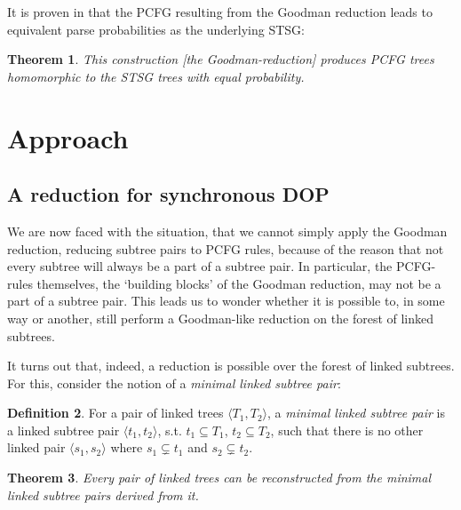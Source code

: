 \documentclass[a4paper]{article}
\newtheorem{theorem}{Theorem}[section]
\theoremstyle{definition}
\newtheorem{definition}[theorem]{Definition}
\begin{document}
It is proven in \cite{Go} that the PCFG resulting from the Goodman reduction leads to equivalent parse probabilities as the underlying STSG:

\begin{theorem}
This construction [the Goodman-reduction] produces PCFG trees homomorphic to the STSG trees with equal probability.
\end{theorem}

\section{Approach}

\subsection{A reduction for synchronous DOP}

We are now faced with the situation, that we cannot simply apply the Goodman reduction, reducing subtree pairs to PCFG rules, because of the reason that not every subtree will always be a part of a subtree pair. In particular, the PCFG-rules themselves, the `building blocks' of the Goodman reduction, may not be a part of a subtree pair. This leads us to wonder whether it is possible to, in some way or another, still perform a Goodman-like reduction on the forest of linked subtrees.

It turns out that, indeed, a reduction is possible over the forest of linked subtrees. For this, consider the notion of a \emph{minimal linked subtree pair}:

\begin{definition}
For a pair of linked trees $\langle T_1, T_2 \rangle$, a \emph{minimal linked subtree pair} is a linked subtree pair $\langle t_1, t_2 \rangle$, s.t. $t_1 \subseteq T_1$, $t_2 \subseteq T_2$, such that there is no other linked pair $\langle s_1, s_2 \rangle$ where $s_1 \subsetneq t_1$ and $s_2 \subsetneq t_2$.
\end{definition}

\begin{theorem}
Every pair of linked trees can be reconstructed from the minimal linked subtree pairs derived from it.
\end{theorem}
\end{document}
